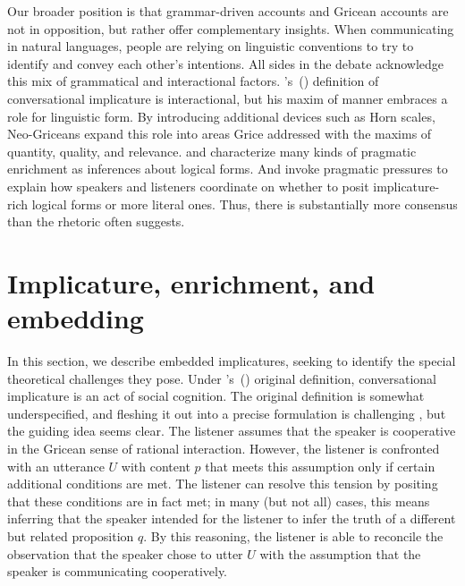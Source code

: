 \documentclass[leqno,12pt]{article}
\newcommand{\posscitet}[1]{\citeauthor{#1}'s~(\citeyear{#1})}
\begin{document}
{Our broader position is that grammar-driven accounts and Gricean
accounts are not in opposition, but rather offer complementary
insights.  When communicating in natural languages, people are relying
on linguistic conventions to try to identify and convey each other's
intentions. All sides in the debate acknowledge this mix of
grammatical and interactional factors. \posscitet{Grice75} definition
of conversational implicature is interactional, but his maxim of
manner embraces a role for linguistic form. By introducing additional
devices such as Horn scales, Neo-Griceans expand this role into areas
Grice addressed with the maxims of quantity, quality, and
relevance. \citet{Sperber95} and \citet{Bach94} characterize many
kinds of pragmatic enrichment as inferences about logical forms. And
\citet{ChierchiaFoxSpector08} invoke pragmatic pressures to explain
how speakers and listeners coordinate on whether to posit
implicature-rich logical forms or more literal ones. Thus, there is
substantially more consensus than the rhetoric often suggests.



\section{Implicature, enrichment, and embedding}\label{sec:implicature}

In this section, we describe embedded implicatures, seeking to
identify the special theoretical challenges they pose.  Under
\posscitet{Grice75} original definition, conversational implicature is
an act of social cognition. The original definition is somewhat
underspecified, and fleshing it out into a precise formulation is
challenging \citep{Hirschberg85}, but the guiding idea seems clear.
The listener assumes that the speaker is cooperative in the Gricean
sense of rational interaction. However, the listener is confronted
with an utterance $U$ with content $p$ that meets this assumption only
if certain additional conditions are met. The listener can resolve
this tension by positing that these conditions are in fact met; in
many (but not all) cases, this means inferring that the speaker
intended for the listener to infer the truth of a different but
related proposition $q$. By this reasoning, the listener is able to
reconcile the observation that the speaker chose to utter $U$ with the
assumption that the speaker is communicating cooperatively.

}
\end{document}

